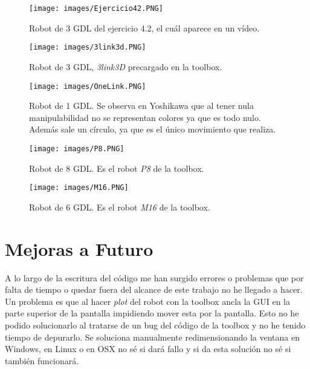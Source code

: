 \documentclass[a4paper, fontsize=11pt]{scrartcl} %
\numberwithin{equation}{section} %
\numberwithin{figure}{section} %
\numberwithin{table}{section} %
\begin{document}
	\begin{figure}[h!]
		\centering
		\texttt{[image: images/Ejercicio42.PNG]}
		\caption{Robot de 3 GDL del ejercicio 4.2, el cuál aparece en un vídeo.}
		\label{Ejercicio42}
	\end{figure}
	\FloatBarrier
	
	\begin{figure}[h!]
		\centering
		\texttt{[image: images/3link3d.PNG]}
		\caption{Robot de 3 GDL, \textit{3link3D} precargado en la toolbox.}
		\label{3link3D}
	\end{figure}
	\FloatBarrier
	
	\begin{figure}[h!]
		\centering
		\texttt{[image: images/OneLink.PNG]}
		\caption{Robot de 1 GDL. Se observa en Yoshikawa que al tener nula manipulabilidad no se representan colores ya que es todo nulo. Además sale un círculo, ya que es el único movimiento que realiza.}
		\label{OneLink}
	\end{figure}
	\FloatBarrier
	
	\begin{figure}[h!]
		\centering
		\texttt{[image: images/P8.PNG]}
		\caption{Robot de 8 GDL. Es el robot \textit{P8} de la toolbox.}
		\label{P8}
	\end{figure}
	\FloatBarrier

	\begin{figure}[h!]
		\centering
		\texttt{[image: images/M16.PNG]}
		\caption{Robot de 6 GDL. Es el robot \textit{M16} de la toolbox.}
		\label{M16}
	\end{figure}
	\FloatBarrier

	\section{Mejoras a Futuro}
	
	A lo largo de la escritura del código me han surgido errores o problemas que por falta de tiempo o quedar fuera del alcance de este trabajo no he llegado a hacer.\\
	
	Un problema es que al hacer \textit{plot} del robot con la toolbox ancla la GUI en la parte superior de la pantalla impidiendo mover esta por la pantalla. Esto no he podido solucionarlo al tratarse de un bug del código de la toolbox y no he tenido tiempo de depurarlo. Se soluciona manualmente redimensionando la ventana en Windows, en Linux o en OSX no sé si dará fallo y si da esta solución no sé si también funcionará.\\
	
\end{document}
